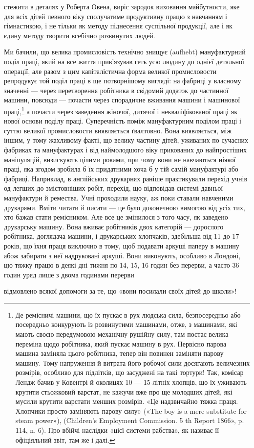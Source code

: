стежити в деталях у Роберта Овена, виріс зародок виховання
майбутности, яке для всіх дітей певного віку сполучатиме продуктивну
працю з навчанням і гімнастикою, і не тільки як методу
піднесення суспільної продукції, але і як єдину методу творити
всебічно розвинутих людей.

Ми бачили, що велика промисловість технічно знищує (aufhebt)
мануфактурний поділ праці, який на все життя прив’язував
геть усю людину до однієї детальної операції, але разом з цим
капіталістична форма великої промисловости репродукує той
поділ праці в ще потворнішому вигляді: на фабриці у власному
значенні — через перетворення робітника в свідомий додаток
до частинної машини, повсюди — почасти через спорадичне вживання
машини і машинової праці,\footnote{
Де ремісничі машини, що їх пускає в рух людська сила, безпосередньо
або посередньо конкурують із розвинутими машинами, отже, з
машинами, які мають своєю передумовою механічну рушійну силу, там
постає велика переміна щодо робітника, який пускає машину в рух.
Первісно парова машина заміняла цього робітника, тепер він повинен
заміняти парову машину. Тому напруження й витрата його робочої сили
досягають величезних розмірів, особливо для підлітків, що засуджені
на такі тортури! Так, комісар Лендж бачив у Ковентрі й околицях 10 —
15-літніх хлопців, що їх уживають крутити стьожковий варстат, не
кажучи вже про ще молодших дітей, які мусили крутити варстати менших
розмірів. «Це надзвичайно тяжка праця. Хлопчики просто заміняють
парову силу» («The boy is a mere substitute for steam power»),
(Children’s Employment Commission. 5 th Report 1866», p. 114, n. 6). Про
вбійчі наслідки «цієї системи рабства», як називає її офіціяльний звіт,
там же і далі.
} а почасти через заведення
жіночої, дитячої і некваліфікованої праці як нової основи поділу
праці. Суперечність поміж мануфактурним поділом праці і суттю
великої промисловости виявляється ґвалтовно. Вона виявляється,
між іншим, у тому жахливому факті, що велику частину дітей,
уживаних по сучасних фабриках та мануфактурах і від наймолодшого
віку прикованих до найпростіших маніпуляцій, визискують
цілими роками, при чому вони не навчаються ніякої праці, яка
згодом зробила б їх придатними хоча б у тій самій мануфактурі
або фабриці. Наприклад, в англійських друкарнях раніше практикували
перехід учнів од легших до змістовніших робіт, перехід,
що відповідав системі давньої мануфактури й ремества. Учні
проходили науку, аж поки ставали навченими друкарями. Вміти
читати й писати — це було доконечною вимогою від усіх тих,
хто бажав стати ремісником. Але все це змінилося з того часу,
як заведено друкарську машину. Вона вживає робітників двох
категорій — дорослого робітника, доглядача машини, і друкарських
хлопчаків, здебільша від 11 до 17 років, що їхня праця
виключно в тому, щоб подавати аркуші паперу в машину абож
забирати з неї надруковані аркуші. Вони виконують, особливо
в Лондоні, цю тяжку працю в деякі дні тижня по 14, 15, 16 годин
без перерви, а часто 36 годин уряд лише з двома годинами перерви

відмовлено всякої допомоги за те, що «вони посилали своїх дітей до
школи»!